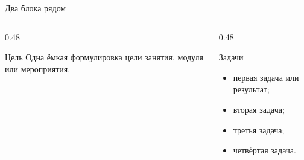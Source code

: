 \begin{frame}{Два блока рядом}
  \vspace{0.3em}
  \begin{columns}[T]
    \begin{column}{0.48\textwidth}
      \begin{block}{Цель}
        Одна ёмкая формулировка цели занятия, модуля или мероприятия.
      \end{block}
    \end{column}
    \begin{column}{0.48\textwidth}
      \begin{block}{Задачи}
        \begin{itemize}
          \item первая задача или результат;
          \item вторая задача;
          \item третья задача;
          \item четвёртая задача.
        \end{itemize}
      \end{block}
    \end{column}
  \end{columns}
\end{frame}
